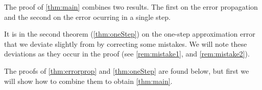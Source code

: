 The proof of \cref{thm:main} combines two results.
The first on the error propagation and the second on the error
ocurring in a single step.

It is in the second theorem (\ref{thm:oneStep})
on the one-step approximation error
that we deviate slightly from  by correcting some mistakes.
We will note these deviations as they occur in the proof
(see \cref{rem:mistake1}, and \cref{rem:mistake2}).

The proofs of \cref{thm:errorprop} and \cref{thm:oneStep} are
found below, but first 
we will show how to combine them to obtain
\cref{thm:main}.





